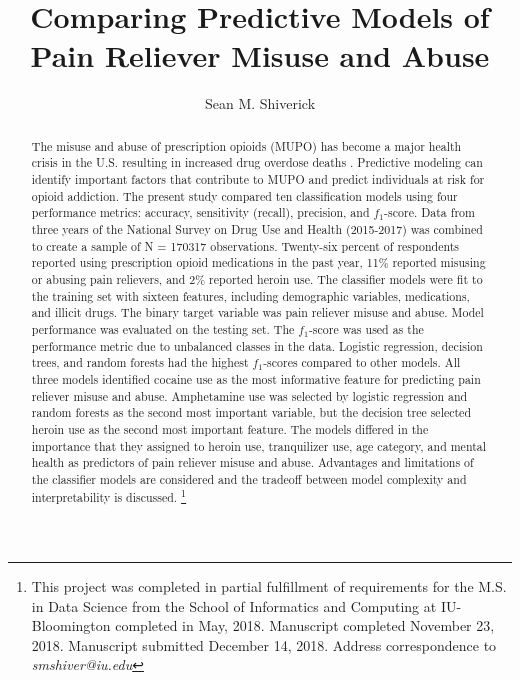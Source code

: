 \documentclass[sigconf]{acmart}
\begin{document}
  \title{Comparing Predictive Models of Pain Reliever Misuse and Abuse}
  \author{Sean M. Shiverick}
\renewcommand{\shortauthors}{S.M. Shiverick}


\begin{abstract}

The misuse and abuse of prescription opioids (MUPO) has become a major 
health crisis in the U.S. resulting in increased drug overdose deaths
\cite{nida18}. Predictive modeling can identify important factors that 
contribute to MUPO and predict individuals at risk for opioid addiction. 
The present study compared ten classification models using four performance 
metrics: accuracy, sensitivity (recall), precision, and $f_1$-score. Data 
from three years of the National Survey on Drug Use and Health (2015-2017) 
was combined to create a sample of N = 170317 observations. Twenty-six percent 
of respondents reported using prescription opioid medications in the past year,
11\% reported misusing or abusing pain relievers, and 2\% reported heroin use. 
The classifier models were fit to the training set with sixteen features, 
including demographic variables, medications, and illicit drugs. The binary 
target variable was pain reliever misuse and abuse. Model performance was 
evaluated on the testing set. The $f_1$-score was used as the performance 
metric due to unbalanced classes in the data. Logistic regression, decision 
trees, and random forests had the highest $f_1$-scores compared to other models.
All three models identified cocaine use as the most informative feature for 
predicting pain reliever misuse and abuse. Amphetamine use was selected by 
logistic regression and random forests as the second most important variable, 
but the decision tree selected heroin use as the second most important feature. 
The models differed in the importance that they assigned to heroin use, 
tranquilizer use, age category, and mental health as predictors of pain 
reliever misuse and abuse. Advantages and limitations of the classifier models 
are considered and the tradeoff between model complexity and interpretability  
is discussed. 
\footnote{This project was completed in partial fulfillment of requirements 
for the M.S. in Data Science from the School of Informatics and Computing at 
IU-Bloomington completed in May, 2018. Manuscript completed November 23, 2018. 
Manuscript submitted December 14, 2018. Address correspondence to 
\textit{smshiver@iu.edu}}

\end{abstract}
\maketitle
\end{document}
